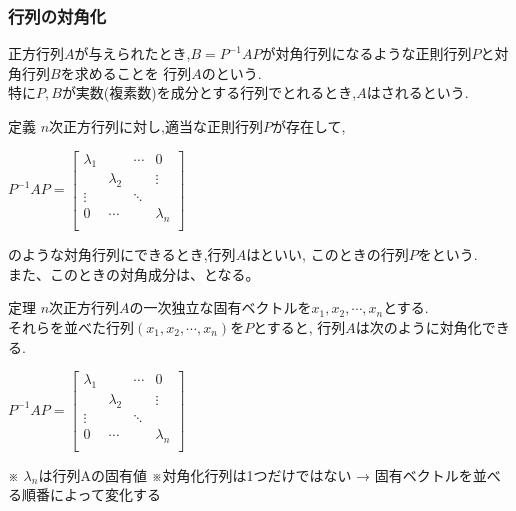 \documentclass[a4paper]{jsarticle}
\begin{document}
\subsubsection{行列の対角化}
正方行列$A$が与えられたとき,$B=P^{-1}AP$が対角行列になるような正則行列$P$と対角行列$B$を求めることを
行列$A$のという.\\
特に$P,B$が実数(複素数)を成分とする行列でとれるとき,$A$はされるという.
\begin{itembox}[l]{定義}
    $n$次正方行列に対し,適当な正則行列$P$が存在して,\\
    \begin{center}
        $P^{-1}AP=
            \begin{bmatrix}
                \lambda_1 &           & \cdots & 0         \\
                          & \lambda_2 &        & \vdots    \\
                \vdots    &           & \ddots &           \\
                0         & \cdots    &        & \lambda_n \\
            \end{bmatrix}
        $
    \end{center}
    のような対角行列にできるとき,行列$A$はといい,
    このときの行列$P$をという.\\
    また、このときの対角成分は、となる。
\end{itembox}
\begin{itembox}[l]{定理}
    $n$次正方行列$A$の一次独立な固有ベクトルを$x_1,x_2,\cdots,x_n$とする.\\
    それらを並べた行列$\left(x_1,x_2,\cdots,x_n\right)$を$P$とすると,
    行列$A$は次のように対角化できる.
    \begin{center}
        $P^{-1}AP=
            \begin{bmatrix}
                \lambda_1 &           & \cdots & 0         \\
                          & \lambda_2 &        & \vdots    \\
                \vdots    &           & \ddots &           \\
                0         & \cdots    &        & \lambda_n \\
            \end{bmatrix}
        $
    \end{center}
    ※ $\lambda_n$は行列Aの固有値
    ※対角化行列は1つだけではない → 固有ベクトルを並べる順番によって変化する
\end{itembox}
\end{document}
